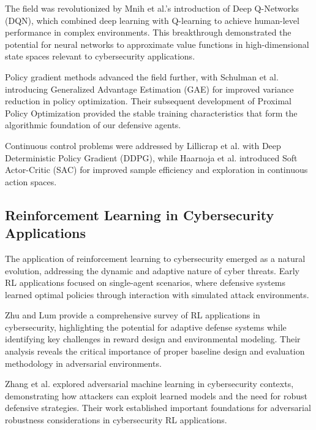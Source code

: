 \documentclass[12pt]{article}
\theoremstyle{definition}
\theoremstyle{plain}
\begin{document}
The field was revolutionized by Mnih et al.'s \cite{mnih2015human} introduction of Deep Q-Networks (DQN), which combined deep learning with Q-learning to achieve human-level performance in complex environments. This breakthrough demonstrated the potential for neural networks to approximate value functions in high-dimensional state spaces relevant to cybersecurity applications.

Policy gradient methods advanced the field further, with Schulman et al. \cite{schulman2015generalized} introducing Generalized Advantage Estimation (GAE) for improved variance reduction in policy optimization. Their subsequent development of Proximal Policy Optimization \cite{schulman2017proximal} provided the stable training characteristics that form the algorithmic foundation of our defensive agents.

Continuous control problems were addressed by Lillicrap et al. \cite{lillicrap2015continuous} with Deep Deterministic Policy Gradient (DDPG), while Haarnoja et al. \cite{haarnoja2018soft} introduced Soft Actor-Critic (SAC) for improved sample efficiency and exploration in continuous action spaces.

\subsection{Reinforcement Learning in Cybersecurity Applications}

The application of reinforcement learning to cybersecurity emerged as a natural evolution, addressing the dynamic and adaptive nature of cyber threats. Early RL applications focused on single-agent scenarios, where defensive systems learned optimal policies through interaction with simulated attack environments.

Zhu and Lum \cite{zhu2021survey} provide a comprehensive survey of RL applications in cybersecurity, highlighting the potential for adaptive defense systems while identifying key challenges in reward design and environmental modeling. Their analysis reveals the critical importance of proper baseline design and evaluation methodology in adversarial environments.

Zhang et al. \cite{zhang2020adversarial} explored adversarial machine learning in cybersecurity contexts, demonstrating how attackers can exploit learned models and the need for robust defensive strategies. Their work established important foundations for adversarial robustness considerations in cybersecurity RL applications.
\end{document}
